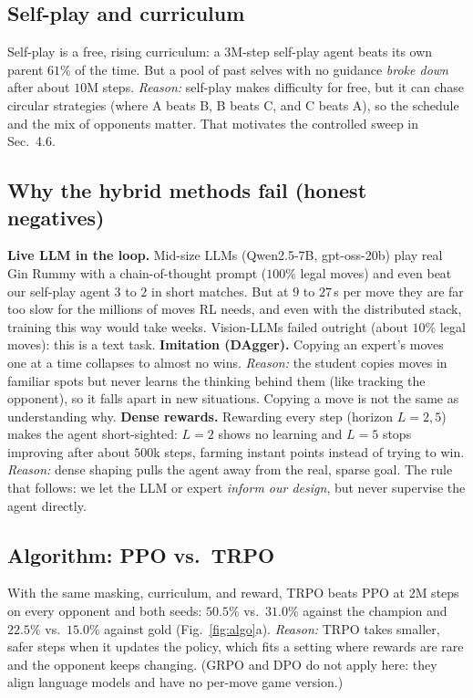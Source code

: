 \documentclass[10pt]{article}
\begin{document}
\subsection{Self-play and curriculum}
Self-play is a free, rising curriculum: a $3$M-step self-play agent beats its own parent $61\%$ of the
time. But a pool of past selves with no guidance \emph{broke down} after about $10$M steps.
\emph{Reason:} self-play makes difficulty for free, but it can chase circular strategies (where A
beats B, B beats C, and C beats A), so the schedule and the mix of opponents matter. That motivates the controlled sweep in
Sec.~4.6.

\subsection{Why the hybrid methods fail (honest negatives)}
\textbf{Live LLM in the loop.} Mid-size LLMs (Qwen2.5-7B, gpt-oss-20b) play real Gin Rummy with a
chain-of-thought prompt ($100\%$ legal moves) and even beat our self-play agent $3$ to $2$ in short
matches. But at $9$ to $27$\,s per move they are far too slow for the millions of moves RL needs, and
even with the distributed stack, training this way would take weeks. Vision-LLMs failed outright
(about $10\%$ legal moves): this is a text task. \textbf{Imitation (DAgger).} Copying an expert's
moves one at a time collapses to almost no wins. \emph{Reason:} the student copies moves in familiar
spots but never learns the thinking behind them (like tracking the opponent), so it falls apart in new
situations. Copying a move is not the same as understanding why. \textbf{Dense rewards.} Rewarding
every step (horizon $L\!=\!2,5$) makes the agent short-sighted: $L\!=\!2$ shows no learning and
$L\!=\!5$ stops improving after about $500$k steps, farming instant points instead of trying to win.
\emph{Reason:} dense shaping pulls the agent away from the real, sparse goal. The rule that follows:
we let the LLM or expert \emph{inform our design}, but never supervise the agent directly.

\subsection{Algorithm: PPO vs.\ TRPO}
With the same masking, curriculum, and reward, TRPO beats PPO at $2$M steps on every opponent and both
seeds: $50.5\%$ vs.\ $31.0\%$ against the champion and $22.5\%$ vs.\ $15.0\%$ against gold
(Fig.~\ref{fig:algo}a). \emph{Reason:} TRPO takes smaller, safer steps when it updates the policy,
which fits a setting where rewards are rare and the opponent keeps changing. (GRPO and DPO do not
apply here: they align language models and have no per-move game version.)
\end{document}
